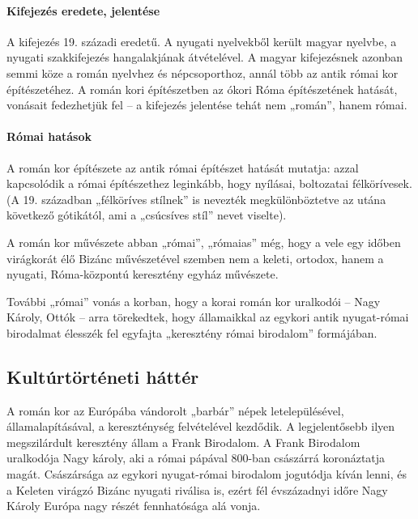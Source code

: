 		\paragraph{Kifejezés eredete, jelentése}
		A kifejezés 19. századi eredetű. A nyugati nyelvekből került magyar nyelvbe, a nyugati szakkifejezés hangalakjának átvételével. A magyar kifejezésnek azonban semmi köze a román nyelvhez és népcsoporthoz, annál több az antik római kor építészetéhez. A román kori építészetben az ókori Róma építészetének hatását, vonásait fedezhetjük fel – a kifejezés jelentése tehát nem „román”, hanem római.
	
		\paragraph{Római hatások}
		\begin{compactitem}
			\item A román kor építészete az antik római építészet hatását mutatja: azzal kapcsolódik a római építészethez leginkább, hogy nyílásai, boltozatai félkörívesek. (A 19. században „félköríves stílnek” is nevezték megkülönböztetve az utána következő gótikától, ami a „csúcsíves stíl” nevet viselte).
			
			\item A román kor művészete abban „római”, „rómaias” még, hogy a vele egy időben virágkorát élő Bizánc művészetével szemben nem a keleti, ortodox, hanem a nyugati, Róma-központú keresztény egyház művészete.
			
			\item További „római” vonás a korban, hogy a korai román kor uralkodói – Nagy Károly, Ottók – arra törekedtek, hogy államaikkal az egykori antik nyugat-római birodalmat élesszék fel egyfajta „keresztény római birodalom” formájában.
		\end{compactitem}
	
	\subsection*{Kultúrtörténeti háttér}
		
		A román kor az Európába vándorolt „barbár” népek letelepülésével, államalapításával, a kereszténység felvételével kezdődik. A legjelentősebb ilyen megszilárdult keresztény állam a Frank Birodalom. A Frank Birodalom uralkodója Nagy károly, aki a római pápával 800-ban császárrá koronáztatja magát. Császársága az egykori nyugat-római birodalom jogutódja kíván lenni, és a Keleten virágzó Bizánc nyugati riválisa is, ezért fél évszázadnyi időre Nagy Károly Európa nagy részét fennhatósága alá vonja.
		
